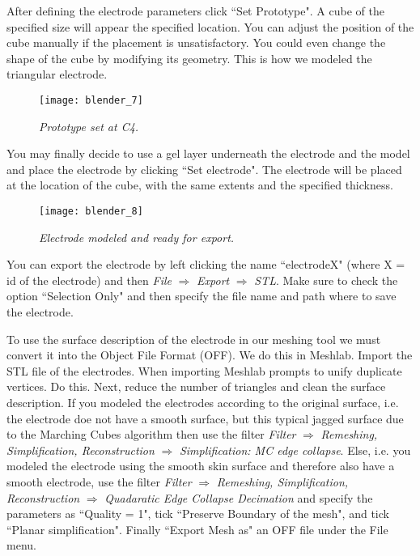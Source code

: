 After defining the electrode parameters click ``Set Prototype". A cube of the specified size will
appear the specified location. You can adjust the position of the cube manually if the placement is
unsatisfactory. You could even change the shape of the cube by modifying its geometry. This is how
we modeled the triangular electrode.
\begin{figure}[H]
   \centering
   \texttt{[image: blender\_7]}
   \caption{\emph{Prototype set at C4.}}
\end{figure}
You may finally decide to use a gel layer underneath the electrode and the model and place the 
electrode by clicking ``Set electrode". The electrode will be placed at the location of the cube,
with the same extents and the specified thickness.
\begin{figure}[H]
   \centering
   \texttt{[image: blender\_8]}
   \caption{\emph{Electrode modeled and ready for export.}}
\end{figure}
You can export the electrode by left clicking the name ``electrodeX" (where X = id of the electrode)
and then \emph{File} $\Rightarrow$ \emph{Export} $\Rightarrow$ \emph{STL}. Make sure to check the
option ``Selection Only" and then specify the file name and path where to save the electrode.\par
To use the surface description of the electrode in our meshing tool we must convert it into the
Object File Format (OFF). We do this in Meshlab. Import the STL file of the electrodes. When importing
Meshlab prompts to unify duplicate vertices. Do this. Next, reduce the number of triangles and clean
the surface description. If you modeled the electrodes according to the original surface, i.e. the electrode
doe not have a smooth surface, but this typical jagged surface due to the Marching Cubes algorithm
then use the filter \emph{Filter} $\Rightarrow$ \emph{Remeshing, Simplification, Reconstruction}
$\Rightarrow$ \emph{Simplification: MC edge collapse}. Else, i.e. you modeled the electrode using the
smooth skin surface and therefore also have a smooth electrode, use the filter \emph{Filter} $\Rightarrow$
\emph{Remeshing, Simplification, Reconstruction} $\Rightarrow$ \emph{Quadaratic Edge Collapse Decimation}
and specify the parameters as ``Quality = 1", tick ``Preserve Boundary of the mesh", and tick ``Planar 
simplification". Finally ``Export Mesh as" an OFF file under the File menu.

